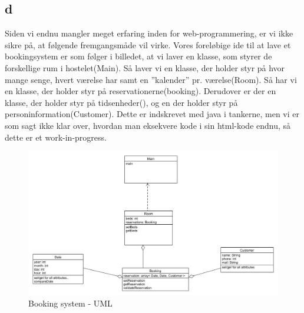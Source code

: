 \documentclass[12pt,a4paper]{article}
\begin{document}
\subsection{d}
Siden vi endnu mangler meget erfaring inden for web-programmering, er vi ikke sikre på, at følgende fremgangsmåde vil virke. Vores foreløbige ide til at lave et bookingsystem er som følger i billedet, at vi laver en klasse, som styrer de forskellige rum i hostelet(Main). Så laver vi en klasse, der holder styr på hvor mange senge, hvert værelse har samt en ”kalender” pr. værelse(Room). Så har vi en klasse, der holder styr på reservationerne(booking). Derudover er der en klasse, der holder styr på tidsenheder(), og en der holder styr på personinformation(Customer). Dette er indskrevet med java i tankerne, men vi er som sagt ikke klar over, hvordan man eksekvere kode i sin html-kode endnu, så dette er et work-in-progress.\\
\begin{figure}[H]
\includegraphics[scale=0.4]{unfinished.jpg}
\caption{Booking system - UML}
\end{figure}
\end{document}
